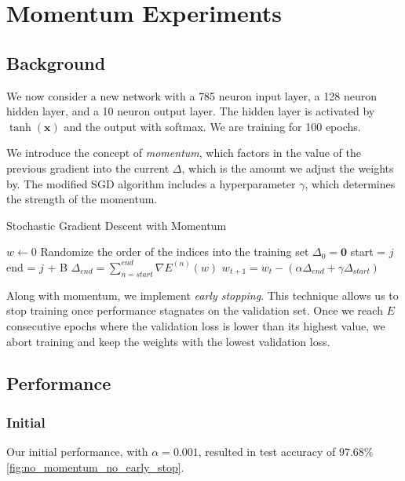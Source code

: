 \section{Momentum Experiments}

\subsection{Background}

We now consider a new network with a 785 neuron input layer, a 128 neuron
hidden layer, and a 10 neuron output layer. The hidden layer is activated by
$\tanh(\mathbf x)$ and the output with softmax. We are training for 100 epochs.

We introduce the concept of \textit{momentum}, which factors in the value of the
previous gradient into the current $\Delta$, which is the amount we adjust the weights by.
The modified SGD algorithm includes a hyperparameter $\gamma$, which determines the strength
of the momentum.

\begin{algorithm}
	\caption{Stochastic Gradient Descent with Momentum}
	\begin{algorithmic}
		\State $w \gets 0$
		\State Randomize the order of the indices into the training set
		\State $\Delta_{0} = \mathbf 0$
		\State start = $j$
		\State end = $j$ + B
		\State $\Delta_{end} = \sum_{n = start}^{end} \nabla E^{(n)}(w)$
		\State $w_{t + 1} = w_t - (\alpha \Delta_{end} + \gamma \Delta_{start})$
		\EndFor
		\EndFor
	\end{algorithmic}
\end{algorithm}


Along with momentum, we implement \textit{early stopping}. This technique allows us
to stop training once performance stagnates on the validation set. Once  we reach
$E$ consecutive epochs where the validation loss is lower than its highest value, we
abort training and keep the weights with the lowest validation loss.


\subsection{Performance}

\subsubsection{Initial}

Our initial performance, with $\alpha = 0.001$, resulted in test accuracy of $97.68\%$\cref{fig:no_momentum_no_early_stop}.


